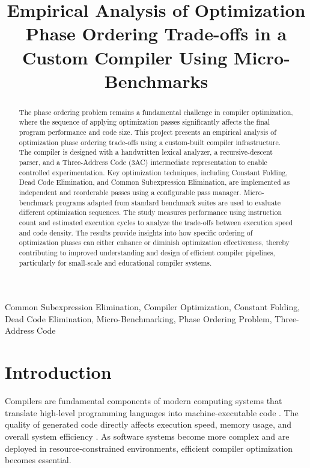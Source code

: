\documentclass[conference]{IEEEtran}
\begin{document}
\title{Empirical Analysis of Optimization Phase Ordering
Trade-offs in a Custom Compiler Using
Micro-Benchmarks}


\maketitle

\begin{abstract}
The phase ordering problem remains a fundamental challenge in compiler optimization, where the sequence of applying optimization passes significantly affects the final program performance and code size. This project presents an empirical analysis of optimization phase ordering trade-offs using a custom-built compiler infrastructure. The compiler is designed with a handwritten lexical analyzer, a recursive-descent parser, and a Three-Address Code (3AC) intermediate representation to enable controlled experimentation. Key optimization techniques, including Constant Folding, Dead Code Elimination, and Common Subexpression Elimination, are implemented as independent and reorderable passes using a configurable pass manager. Micro-benchmark programs adapted from standard benchmark suites are used to evaluate different optimization sequences. The study measures performance using instruction count and estimated execution cycles to analyze the trade-offs between execution speed and code density. The results provide insights into how specific ordering of optimization phases can either enhance or diminish optimization effectiveness, thereby contributing to improved understanding and design of efficient compiler pipelines, particularly for small-scale and educational compiler systems.
\end{abstract}

\begin{IEEEkeywords}
Common Subexpression Elimination,
Compiler Optimization,
Constant Folding,
Dead Code Elimination,
Micro-Benchmarking,
Phase Ordering Problem,
Three-Address Code
\end{IEEEkeywords}

\section{Introduction}

Compilers are fundamental components of modern computing systems that translate high-level programming languages into machine-executable code \cite{ref21}. The quality of generated code directly affects execution speed, memory usage, and overall system efficiency \cite{ref18}. As software systems become more complex and are deployed in resource-constrained environments, efficient compiler optimization becomes essential.
\end{document}
